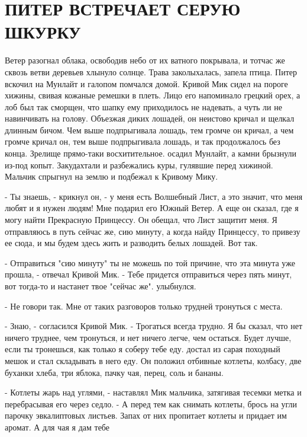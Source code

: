 \chapter{ПИТЕР ВСТРЕЧАЕТ СЕРУЮ ШКУРКУ}
\par{} Ветер разогнал облака, освободив небо от их ватного 
покрывала, и тотчас же сквозь ветви деревьев хлынуло солнце. Трава 
заколыхалась, запела птица. Питер вскочил на Мунлайт и галопом 
помчался домой. Кривой Мик сидел на пороге хижины, свивая кожаные 
ремешки в плеть. Лицо его напоминало грецкий орех, а лоб был так 
сморщен, что шапку ему приходилось не надевать, а чуть ли не 
навинчивать на голову. Объезжая диких лошадей, он неистово кричал и 
щелкал длинным бичом. Чем выше подпрыгивала лошадь, тем громче он 
кричал, а чем громче кричал он, тем выше подпрыгивала лошадь, и так 
продолжалось без конца. Зрелище прямо-таки восхитительное.
 осадил Мунлайт, а камни брызнули из-под копыт. Закудахтали и 
разбежались куры, гулявшие перед хижиной. Мальчик спрыгнул на землю и 
подбежал к Кривому Мику.
\par- Ты знаешь, - крикнул он, - у меня есть Волшебный Лист, а это 
значит, что меня любят и я нужен людям! Мне подарил его Южный Ветер. А 
еще он сказал, где я могу найти Прекрасную Принцессу. Он обещал, что 
Лист защитит меня. Я отправляюсь в путь сейчас же, сию минуту, а когда 
найду Принцессу, то привезу ее сюда, и мы будем здесь жить и разводить 
белых лошадей. Вот так.
\par- Отправиться "сию минуту" ты не можешь по той причине, что эта 
минута уже прошла, - отвечал Кривой Мик. - Тебе придется отправиться 
через пять минут, вот тогда-то и настанет твое "сейчас же".
 улыбнулся.
\par- Не говори так. Мне от таких разговоров только трудней тронуться 
с места.
\par- Знаю, - согласился Кривой Мик. - Трогаться всегда трудно. Я бы 
сказал, что нет ничего труднее, чем тронуться, и нет ничего легче, чем 
остаться. Будет лучше, если ты тронешься, как только я соберу тебе 
еду.
 достал из сарая походный мешок и стал складывать в него 
еду. Он положил отбивные котлеты, колбасу, две буханки хлеба, три 
яблока, пачку чая, перец, соль и бананы.
\par- Котлеты жарь над углями, - наставлял Мик мальчика, затягивая 
тесемки метка и перебрасывая его через седло. - А перед тем как 
снимать котлеты, брось на угли парочку эвкалиптовых листьев. Запах от 
них пропитает котлеты и придает им аромат. А для чая я дам тебе 
